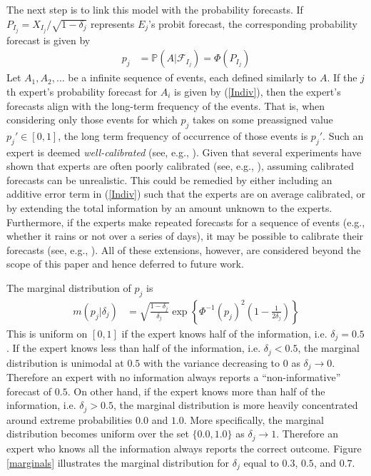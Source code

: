 \documentclass[11pt]{article}
\renewcommand{\P}{\mathbb{P}}
\theoremstyle{definition}
\theoremstyle{definition}
\begin{document}
The next step is to link this model with the probability forecasts. If  $P_{I_j} = X_{I_j}/\sqrt{1-\delta_j}$ represents $E_j$'s probit forecast, the corresponding probability forecast is given by
\begin{align}
p_j &= \P\left(A | \mathcal{F}_{I_j}\right) = \Phi\left( P_{I_j}\right) \label{Indiv}
\end{align}
Let $A_1, A_2, \dots$ be a infinite sequence of events, each defined similarly to $A$. If the $j$th expert's probability forecast for $A_i$ is given by (\ref{Indiv}), then the expert's forecasts align with the long-term frequency of the events. That is, when considering only those events for which $p_j$ takes on some preassigned value $p_j' \in [0, 1]$, the long term frequency of occurrence of those events is $p_j'$. Such an expert is deemed \textit{well-calibrated} (see, e.g., \cite{degroot1983comparison}). Given that several experiments have shown that experts are often poorly calibrated (see, e.g., \cite{cooke1991experts, shlyakhter1994quantifying}), assuming calibrated forecasts can be unrealistic. This could be remedied by  either including an additive error term in (\ref{Indiv}) such that the experts are on average calibrated, or by extending the total information by an amount unknown to the experts. Furthermore, if the experts make repeated forecasts for a sequence of events (e.g., whether it rains or not over a series of days), it may be possible to calibrate their forecasts (see, e.g., \citet{foster1998asymptotic, Brier}). All of these extensions, however, are considered beyond the scope of this paper and hence deferred to future work.

The marginal distribution of $p_j$ is
\begin{align*}
m(p_j | \delta_j) &= \sqrt{\frac{1-\delta_j}{\delta_j}} \exp \left\{ \Phi^{-1}(p_j)^2 \left(1-\frac{1}{2 \delta_j} \right) \right\} 
\end{align*}
This is uniform on $[0,1]$ if the expert knows half of the information, i.e. $\delta_j = 0.5$. If the expert knows less than half of the information, i.e. $\delta_j < 0.5$, the marginal distribution is unimodal at $0.5$ with the variance decreasing to 0 as $\delta_j \to 0$. Therefore an expert with no information always reports a ``non-informative'' forecast of $0.5$. On other hand, if the expert knows more than half of the information, i.e. $\delta_j > 0.5$, the marginal  distribution is more heavily concentrated around extreme probabilities $0.0$ and $1.0$. More specifically, the marginal distribution becomes uniform over the set $\{0.0,1.0\}$ as $\delta_j \to 1$. Therefore an expert who knows all the information always reports the correct outcome. Figure \ref{marginals} illustrates the marginal distribution for $\delta_j$ equal to $0.3$, $0.5$, and $0.7$. 
\end{document}
